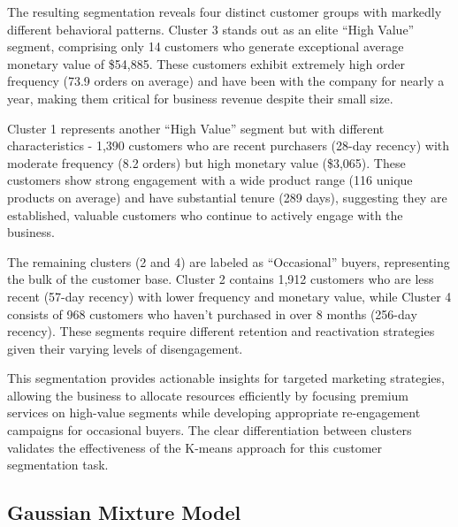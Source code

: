 \documentclass[
]{article}
\begin{document}
The resulting segmentation reveals four distinct customer groups with
markedly different behavioral patterns. Cluster 3 stands out as an elite
``High Value'' segment, comprising only 14 customers who generate
exceptional average monetary value of \$54,885. These customers exhibit
extremely high order frequency (73.9 orders on average) and have been
with the company for nearly a year, making them critical for business
revenue despite their small size.

Cluster 1 represents another ``High Value'' segment but with different
characteristics - 1,390 customers who are recent purchasers (28-day
recency) with moderate frequency (8.2 orders) but high monetary value
(\$3,065). These customers show strong engagement with a wide product
range (116 unique products on average) and have substantial tenure (289
days), suggesting they are established, valuable customers who continue
to actively engage with the business.

The remaining clusters (2 and 4) are labeled as ``Occasional'' buyers,
representing the bulk of the customer base. Cluster 2 contains 1,912
customers who are less recent (57-day recency) with lower frequency and
monetary value, while Cluster 4 consists of 968 customers who haven't
purchased in over 8 months (256-day recency). These segments require
different retention and reactivation strategies given their varying
levels of disengagement.

This segmentation provides actionable insights for targeted marketing
strategies, allowing the business to allocate resources efficiently by
focusing premium services on high-value segments while developing
appropriate re-engagement campaigns for occasional buyers. The clear
differentiation between clusters validates the effectiveness of the
K-means approach for this customer segmentation task.\newpage

\subsection{Gaussian Mixture Model}\label{gaussian-mixture-model}
\end{document}
